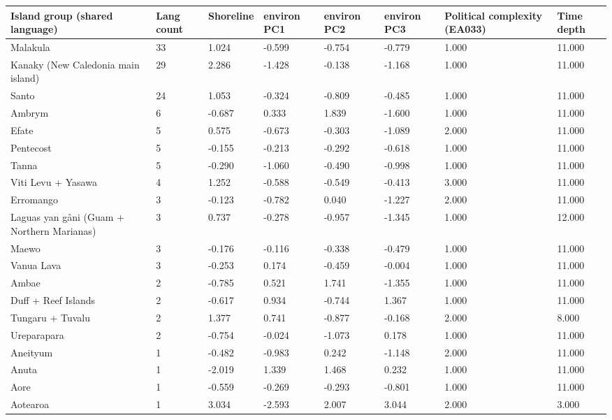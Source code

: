 \begin{longtable}{p{4.5cm}p{1.4cm}p{1.4cm}p{1.4cm}p{1.4cm}p{1.7cm}p{1.7cm}p{1.7cm}}
  \toprule
Island group (shared language) & Lang count & Shoreline & environ PC1 & environ PC2 & environ PC3 & Political complexity (EA033) & Time depth \\ 
  \midrule
Malakula & 33 & 1.024 & -0.599 & -0.754 & -0.779 & 1.000 & 11.000 \\ 
  Kanaky (New Caledonia main island) & 29 & 2.286 & -1.428 & -0.138 & -1.168 & 1.000 & 11.000 \\ 
  Santo & 24 & 1.053 & -0.324 & -0.809 & -0.485 & 1.000 & 11.000 \\ 
  Ambrym & 6 & -0.687 & 0.333 & 1.839 & -1.600 & 1.000 & 11.000 \\ 
  Efate & 5 & 0.575 & -0.673 & -0.303 & -1.089 & 2.000 & 11.000 \\ 
  Pentecost & 5 & -0.155 & -0.213 & -0.292 & -0.618 & 1.000 & 11.000 \\ 
  Tanna & 5 & -0.290 & -1.060 & -0.490 & -0.998 & 1.000 & 11.000 \\ 
  Viti Levu + Yasawa & 4 & 1.252 & -0.588 & -0.549 & -0.413 & 3.000 & 11.000 \\ 
  Erromango & 3 & -0.123 & -0.782 & 0.040 & -1.227 & 2.000 & 11.000 \\ 
  Laguas yan gåni (Guam + Northern Marianas) & 3 & 0.737 & -0.278 & -0.957 & -1.345 & 1.000 & 12.000 \\ 
  Maewo & 3 & -0.176 & -0.116 & -0.338 & -0.479 & 1.000 & 11.000 \\ 
  Vanua Lava & 3 & -0.253 & 0.174 & -0.459 & -0.004 & 1.000 & 11.000 \\ 
  Ambae & 2 & -0.785 & 0.521 & 1.741 & -1.355 & 1.000 & 11.000 \\ 
  Duff + Reef Islands & 2 & -0.617 & 0.934 & -0.744 & 1.367 & 1.000 & 11.000 \\ 
  Tungaru + Tuvalu & 2 & 1.377 & 0.741 & -0.877 & -0.168 & 2.000 & 8.000 \\ 
  Ureparapara & 2 & -0.754 & -0.024 & -1.073 & 0.178 & 1.000 & 11.000 \\ 
  Aneityum & 1 & -0.482 & -0.983 & 0.242 & -1.148 & 2.000 & 11.000 \\ 
  Anuta & 1 & -2.019 & 1.339 & 1.468 & 0.232 & 1.000 & 11.000 \\ 
  Aore & 1 & -0.559 & -0.269 & -0.293 & -0.801 & 1.000 & 11.000 \\ 
  Aotearoa & 1 & 3.034 & -2.593 & 2.007 & 3.044 & 2.000 & 3.000 \\ 

\end{longtable}
